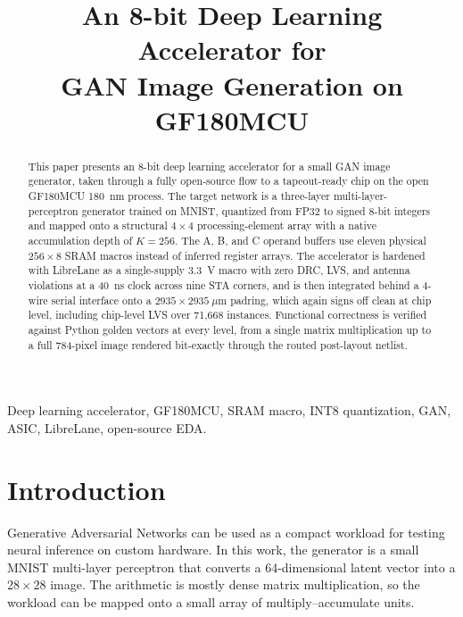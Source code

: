 \documentclass[conference,a4paper]{APSIPA2026}
\begin{document}
\title{An 8-bit Deep Learning Accelerator for\\GAN Image Generation on GF180MCU}

\author{
}

\maketitle
\thispagestyle{firststyle}
\pagestyle{empty}

\begin{abstract}
This paper presents an 8-bit deep learning accelerator for a small GAN image generator, taken through a fully open-source flow to a tapeout-ready chip on the open GF180MCU 180~nm process. The target network is a three-layer multi-layer-perceptron generator trained on MNIST, quantized from FP32 to signed 8-bit integers and mapped onto a structural $4\times4$ processing-element array with a native accumulation depth of $K=256$. The A, B, and C operand buffers use eleven physical $256\times8$ SRAM macros instead of inferred register arrays. The accelerator is hardened with LibreLane as a single-supply 3.3~V macro with zero DRC, LVS, and antenna violations at a 40~ns clock across nine STA corners, and is then integrated behind a 4-wire serial interface onto a $2935\times2935~\mu$m padring, which again signs off clean at chip level, including chip-level LVS over 71{,}668 instances. Functional correctness is verified against Python golden vectors at every level, from a single matrix multiplication up to a full 784-pixel image rendered bit-exactly through the routed post-layout netlist.
\end{abstract}

\begin{IEEEkeywords}
Deep learning accelerator, GF180MCU, SRAM macro, INT8 quantization, GAN, ASIC, LibreLane, open-source EDA.
\end{IEEEkeywords}

\section{Introduction}
Generative Adversarial Networks can be used as a compact workload for testing neural inference on custom hardware. In this work, the generator is a small MNIST multi-layer perceptron that converts a 64-dimensional latent vector into a $28\times28$ image. The arithmetic is mostly dense matrix multiplication, so the workload can be mapped onto a small array of multiply--accumulate units.
\end{document}
